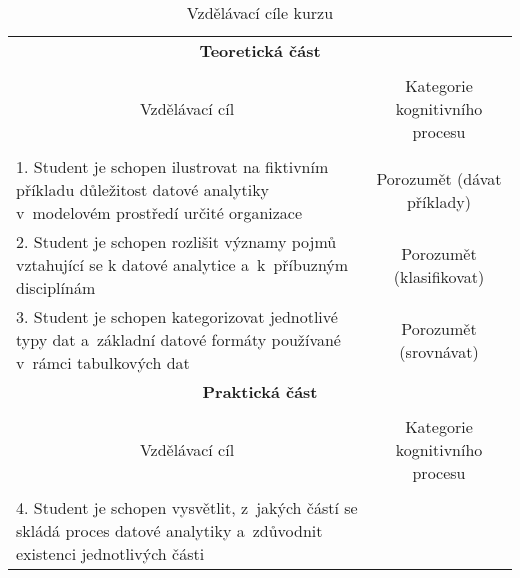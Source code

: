 

\begin{table}[htbp]

\renewcommand\thetable{1}

\caption{Vzdělávací cíle kurzu}\label{tab-cile}

\footnotesize

{

\begin{tabularx}{\linewidth}{p{9cm}c}

\toprule

\multicolumn{2}{c}{\textbf{Teoretická část}}

\tabularnewline
\\

\multicolumn{1}{c}{Vzdělávací cíl} & Kategorie kognitivního procesu 

\tabularnewline
\\
\midrule

1. Student je schopen ilustrovat na fiktivním příkladu důležitost datové analytiky v~modelovém prostředí určité organizace\label{1-cil}

&

Porozumět (dávat příklady)

\\
\midrule

2. Student je schopen rozlišit významy pojmů vztahující se k datové analytice a~k~příbuzným disciplínám\label{2-cil}

&

Porozumět (klasifikovat)

\\

\midrule

3. Student je schopen kategorizovat jednotlivé typy dat a~základní datové formáty používané v~rámci tabulkových dat\label{3-cil}

&

Porozumět (srovnávat)

\\
\toprule

\multicolumn{2}{c}{\textbf{Praktická část}}

\\

\tabularnewline

\multicolumn{1}{c}{Vzdělávací cíl} & Kategorie kognitivního procesu 

\tabularnewline
\\
\midrule

4. Student je schopen vysvětlit, z~jakých částí se skládá proces datové analytiky a~zdůvodnit existenci jednotlivých části\label{4-cil}


\end{tabularx}}
\end{table}
